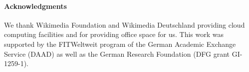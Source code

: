 \documentclass[a4paper]{article}
\begin{document}
\paragraph*{Acknowledgments} We thank Wikimedia Foundation and Wikimedia Deutschland providing cloud computing facilities and for providing office space for us.
This work was supported by the FITWeltweit program of the German Academic Exchange Service (DAAD) as well as the German Research Foundation (DFG grant GI-1259-1).
\end{document}
